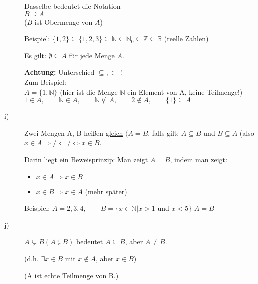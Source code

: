 \documentclass[a4paper, 12pt, twoside] {article}
\begin{document}
\begin{description}
	Dasselbe bedeutet die Notation\\
	$B \supseteq A$ \\
	($B$ ist Obermenge von $A$)
	
	Beispiel: $\{1,2\} \subseteq \{1,2,3\} \subseteq \mathbb{N} \subseteq \mathbb{N}_0 \subseteq \mathbb{Z} \subseteq \mathbb{R}$ (reelle Zahlen)
	
	Es gilt: $\emptyset \subseteq A$ für jede Menge $A$.

	\textbf{Achtung: } Unterschied $\subseteq, \in$ !\\
	Zum Beispiel: \\
	$A = \{1, \mathbb{N}\}$ (hier ist die Menge $\mathbb{N}$ ein Element von A, keine Teilmenge!)\\
	$1 \in A, \qquad \mathbb{N} \in A, \qquad \mathbb{N} \nsubseteq A, \qquad 2 \notin A, \qquad \{1\} \subseteq A$


\item[i)] Zwei Mengen A, B heißen \underline{gleich} $(A = B$, falls gilt: $A \subseteq B$ und $B \subseteq A$
(also $x \in A \Rightarrow / \Leftarrow / \Leftrightarrow x \in B$.


Darin liegt ein Beweisprinzip: Man zeigt $A = B$, indem man zeigt:
\begin{itemize}
\item $x \in A \Rightarrow x \in B$
\item $x \in B \Rightarrow x \in A$ (mehr später)
\end{itemize}

Beispiel:
$A = {2, 3, 4}, \qquad B = \{ x \in \mathbb{N} | x > 1$ und $x < 5\}$
$A = B$

\item[j)] $A \subsetneq B (A \subsetneqq B)$ bedeutet $A \subseteq B$, aber $A \neq B$.

(d.h. $\exists x \in B$ mit $x \notin A$, aber $x \in B$)

(A ist \underline{echte} Teilmenge von B.)


\end{description}
\end{document}
